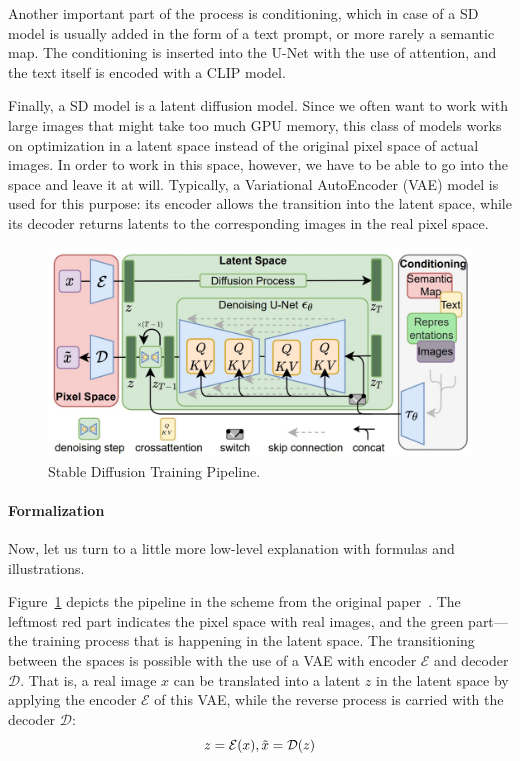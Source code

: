 Another important part of the process is conditioning, which in case of a SD model is usually added in the form of a text prompt, or more rarely a semantic map.
The conditioning is inserted into the U-Net with the use of attention, and the text itself is encoded with a CLIP model. 

Finally, a SD model is a latent diffusion model. 
Since we often want to work with large images that might take too much GPU memory, this class of models works on optimization in a latent space instead of the original pixel space of actual images. 
In order to work in this space, however, we have to be able to go into the space and leave it at will.
Typically, a Variational AutoEncoder (VAE) model is used for this purpose: its encoder allows the transition into the latent space, while its decoder returns latents to the corresponding images in the real pixel space.



\begin{figure}[ht!]
\centering
\includegraphics[width=120mm]{figures/sd.jpg}
\caption{Stable Diffusion Training Pipeline.}
\label{sd}
\end{figure}

\paragraph{Formalization} Now, let us turn to a little more low-level explanation with formulas and illustrations.

Figure~\ref{sd} depicts the pipeline in the scheme from the original paper~\cite{stable_dif}.
The leftmost red part indicates the pixel space with real images, and the green part---the training process that is happening in the latent space.
The transitioning between the spaces is possible with the use of a VAE with encoder $\mathcal{E}$ and decoder $\mathcal{D}$.
That is, a real image $x$ can be translated into a latent $z$ in the latent space by applying the encoder $\mathcal{E}$ of this VAE, while the reverse process is carried with the decoder $\mathcal{D}$: 
$$z = \mathcal{E}(x), \Tilde{x} = \mathcal{D}(z)$$

